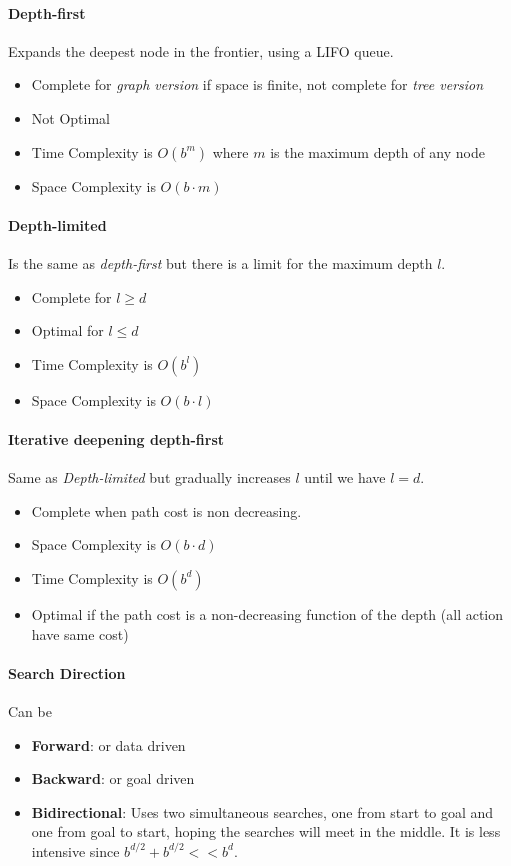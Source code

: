 \documentclass[10pt,a4paper]{article}
\begin{document}
\paragraph{Depth-first}
Expands the deepest node in the frontier, using a \textsc{LIFO} queue.
\begin{itemize}
\item Complete for \textit{graph version} if space is finite, not complete for \textit{tree version}
\item Not Optimal
\item Time Complexity is $O(b^m)$ where $m$ is the maximum depth of any node
\item Space Complexity is $O(b\cdot m)$ 
\end{itemize}


\paragraph{Depth-limited}
Is the same as \textit{depth-first} but there is a limit for the maximum depth $l$.

\begin{itemize}
\item Complete for $l \ge d$
\item Optimal for $l \le d$
\item Time Complexity is $O(b^l)$ 
\item Space Complexity is $O(b\cdot l)$ 
\end{itemize}

\paragraph{Iterative deepening depth-first}
Same as \textit{Depth-limited} but gradually increases $l$ until we have $l=d$.

\begin{itemize}
\item Complete when path cost is non decreasing.
\item Space Complexity is $O(b\cdot d)$ 
\item Time Complexity is $O(b^d)$ 
\item Optimal if the path cost is a non-decreasing function of the depth (all action have same cost)

\end{itemize}

\paragraph{Search Direction}
Can be 
\begin{itemize}
\item \textbf{Forward}: or data driven
\item \textbf{Backward}: or goal driven 
\item \textbf{Bidirectional}:
Uses two simultaneous searches, one from start to goal and one from goal to start, hoping the searches will meet in the middle. It is less intensive since $b^{d/2}+b^{d/2}<<b^d$.
\end{itemize}
\end{document}
